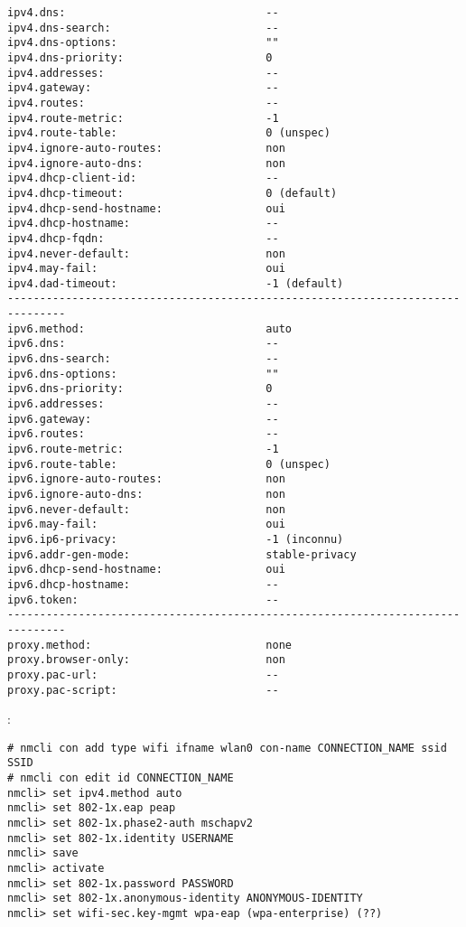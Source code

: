 \begin{itemize}
\begin{lstlisting}[basicstyle=\small\ttfamily,columns=flexible,breaklines=true]
ipv4.dns:                               --
ipv4.dns-search:                        --
ipv4.dns-options:                       ""
ipv4.dns-priority:                      0
ipv4.addresses:                         --
ipv4.gateway:                           --
ipv4.routes:                            --
ipv4.route-metric:                      -1
ipv4.route-table:                       0 (unspec)
ipv4.ignore-auto-routes:                non
ipv4.ignore-auto-dns:                   non
ipv4.dhcp-client-id:                    --
ipv4.dhcp-timeout:                      0 (default)
ipv4.dhcp-send-hostname:                oui
ipv4.dhcp-hostname:                     --
ipv4.dhcp-fqdn:                         --
ipv4.never-default:                     non
ipv4.may-fail:                          oui
ipv4.dad-timeout:                       -1 (default)
-------------------------------------------------------------------------------
ipv6.method:                            auto
ipv6.dns:                               --
ipv6.dns-search:                        --
ipv6.dns-options:                       ""
ipv6.dns-priority:                      0
ipv6.addresses:                         --
ipv6.gateway:                           --
ipv6.routes:                            --
ipv6.route-metric:                      -1
ipv6.route-table:                       0 (unspec)
ipv6.ignore-auto-routes:                non
ipv6.ignore-auto-dns:                   non
ipv6.never-default:                     non
ipv6.may-fail:                          oui
ipv6.ip6-privacy:                       -1 (inconnu)
ipv6.addr-gen-mode:                     stable-privacy
ipv6.dhcp-send-hostname:                oui
ipv6.dhcp-hostname:                     --
ipv6.token:                             --
-------------------------------------------------------------------------------
proxy.method:                           none
proxy.browser-only:                     non
proxy.pac-url:                          --
proxy.pac-script:                       --
\end{lstlisting}

:
\begin{verbatim}
# nmcli con add type wifi ifname wlan0 con-name CONNECTION_NAME ssid SSID
# nmcli con edit id CONNECTION_NAME
nmcli> set ipv4.method auto
nmcli> set 802-1x.eap peap
nmcli> set 802-1x.phase2-auth mschapv2
nmcli> set 802-1x.identity USERNAME
nmcli> save
nmcli> activate
nmcli> set 802-1x.password PASSWORD
nmcli> set 802-1x.anonymous-identity ANONYMOUS-IDENTITY
nmcli> set wifi-sec.key-mgmt wpa-eap (wpa-enterprise) (??)
\end{verbatim}


\end{itemize}
